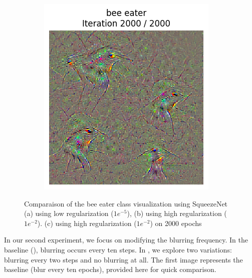 \begin{figure}[H]
\begin{subfigure}[t]{.33\textwidth}
        \caption{}
        \label{fig:class_viz_reg:sub2}
    \end{subfigure}%
    \begin{subfigure}[t]{.33\textwidth}
        \centering
        \includegraphics[width=\linewidth]{figs_propre2/SqueezeNet/SqueezeNet_bird_animated_2000_reg_2_last_frame.png}
        \caption{}
        \label{fig:class_viz_reg:sub3}
    \end{subfigure}
    \caption{Comparaison of the bee eater class visualization using SqueezeNet (a) using low regularization ($ 1e^{-5} $), (b) using high regularization ($ 1e^{-2} $). (c) using high regularization ($ 1e^{-2} $) on 2000 epochs} %
    \label{fig:class_viz_reg}
\end{figure}


In our second experiment, we focus on modifying the blurring frequency. In the baseline (), blurring occurs every ten steps. In , we explore two variations: blurring every two steps and no blurring at all. The first image represents the baseline (blur every ten epochs), provided here for quick comparison.


